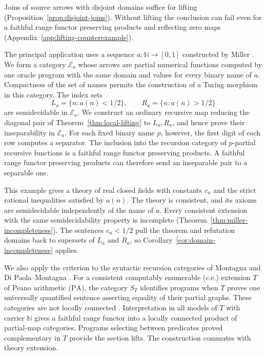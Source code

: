 \documentclass[11pt]{article}
\newcommand{\N}{\mathbb N}
\newcommand{\PA}{\mathrm{PA}}
\begin{document}
Joins of source arrows with disjoint domains suffice for lifting
(Proposition~\ref{prop:disjoint-joins}). Without lifting the conclusion
can fail even for a faithful range functor preserving products and
reflecting zero maps
(Appendix~\ref{app:lifting-counterexample}).

The principal application uses a sequence $a:\N\to[0,1]$ constructed
by Miller \cite{Miller2004}. We form a category $\mathcal E_a$ whose
arrows are partial numerical functions computed by one oracle program
with the same domain and values for every binary name of $a$.
Compactness of the set of names permits the construction of a Turing
morphism in this category. The index sets
\[
 L_a=\{n:a(n)<1/2\},\qquad R_a=\{n:a(n)>1/2\}
\]
are semidecidable in $\mathcal E_a$. We construct an ordinary recursive
map reducing the diagonal pair of Theorem~\ref{thm:local-lifting} to
$L_a,R_a$, and hence prove their inseparability in $\mathcal E_a$.
For each fixed binary name $p$, however, the first digit of each row
computes a separator. The inclusion into the recursion category of
$p$-partial recursive functions is a faithful range functor preserving
products. A faithful range functor preserving products can therefore
send an inseparable pair to a separable one.

This example gives a theory of real closed fields with constants $c_n$
and the strict rational inequalities satisfied by $a(n)$.
The theory is consistent, and its axioms are semidecidable independently
of the name of $a$. Every consistent extension with the same
semidecidability property is incomplete
(Theorem~\ref{thm:miller-incompleteness}). The sentences $c_n<1/2$
pull the theorem and refutation domains back to supersets of $L_a$
and $R_a$, so Corollary~\ref{cor:domain-incompleteness} applies.

We also apply the criterion to the syntactic recursion categories of
Montagna and Di Paola--Montagna \cite{Montagna,DPM}.
For a consistent computably enumerable (c.e.)
extension $T$ of Peano arithmetic ($\PA$), the category $S_T$ identifies
programs when $T$ proves one universally quantified sentence asserting
equality of their partial graphs. These categories are not locally
connected \cite[Corollary 4.4]{DPM}. Interpretation in all models of
$T$ with carrier $\N$ gives a faithful range functor into a locally
connected product of partial-map categories. Programs selecting between
predicates proved complementary in $T$ provide the section lifts.
The construction commutes with theory extension.
\end{document}
